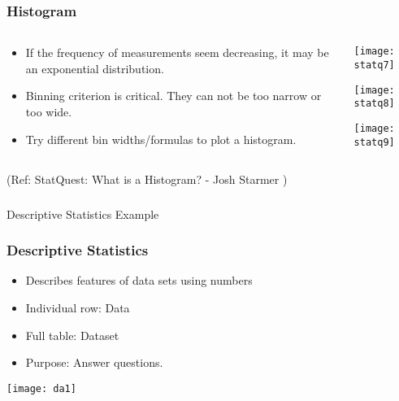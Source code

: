 \begin{frame}[fragile]\frametitle{Histogram}

\begin{columns}
    \begin{column}[T]{0.6\linewidth}

	\begin{itemize}
	\item If the frequency of measurements seem decreasing, it may be an exponential distribution.
	\item Binning criterion is critical. They can not be too narrow or too wide.
	\item Try different bin widths/formulas to plot a histogram.
	\end{itemize}

    \end{column}
    \begin{column}[T]{0.4\linewidth}
      \begin{center}
      \texttt{[image: statq7]}
	  
	  \texttt{[image: statq8]}
	  
	  \texttt{[image: statq9]}	  
	  	\end{center}
    \end{column}

  \end{columns}
  

\tiny{(Ref: StatQuest: What is a Histogram? - Josh Starmer )}
\end{frame}


\begin{frame}[fragile]\frametitle{}
\begin{center}
{\Large Descriptive Statistics Example}
\end{center}
\end{frame}


\begin{frame}[fragile]\frametitle{Descriptive Statistics}
\begin{itemize}
\item Describes features of data sets using numbers
\item Individual row: Data
\item Full table: Dataset
\item Purpose: Answer questions.
\end{itemize}
\begin{center}
\texttt{[image: da1]}
\end{center}
\end{frame}

